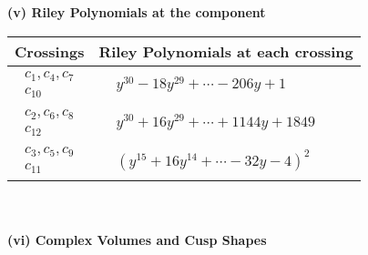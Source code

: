 \documentclass[1p]{elsarticle_modified}
\theoremstyle{definition}
\begin{document}
\newpage\renewcommand{\arraystretch}{1}
\flushleft \textbf{(v) Riley Polynomials at the component}\newline \\
\begin{tabular}{m{50pt}|m{274pt}}
Crossings & \hspace{64pt}Riley Polynomials at each crossing \\
\hline $$\begin{aligned}c_{1},c_{4},c_{7}\\c_{10}\end{aligned}$$&$\begin{aligned}
&y^{30}-18 y^{29}+\cdots-206 y+1
\end{aligned}$\\
\hline $$\begin{aligned}c_{2},c_{6},c_{8}\\c_{12}\end{aligned}$$&$\begin{aligned}
&y^{30}+16 y^{29}+\cdots+1144 y+1849
\end{aligned}$\\
\hline $$\begin{aligned}c_{3},c_{5},c_{9}\\c_{11}\end{aligned}$$&$\begin{aligned}
&(y^{15}+16 y^{14}+\cdots-32 y-4)^{2}
\end{aligned}$\\
\hline
\end{tabular}\\~\\
\newpage\flushleft \textbf{(vi) Complex Volumes and Cusp Shapes}
\end{document}
